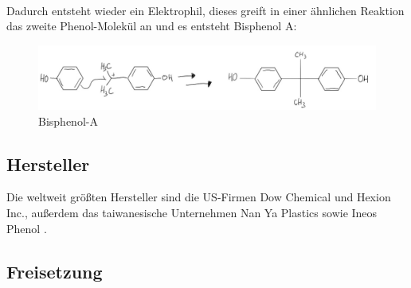 \\Dadurch entsteht wieder ein Elektrophil, dieses greift in einer ähnlichen Reaktion das zweite Phenol-Molekül an und es entsteht Bisphenol A:
\begin{figure}[htpb]
    \centering
    \includegraphics[width=1\textwidth]{BisphenolA.jpg}
    \caption{Bisphenol-A}
\end{figure}
\subsection{Hersteller}
Die weltweit größten Hersteller sind die US-Firmen \glqq Dow Chemical\grqq{} und \glqq Hexion Inc.\grqq{}, außerdem das taiwanesische Unternehmen \glqq Nan Ya Plastics\grqq{} sowie \glqq Ineos Phenol\grqq{} \cite{Wikipedia}.
\subsection{Freisetzung}
